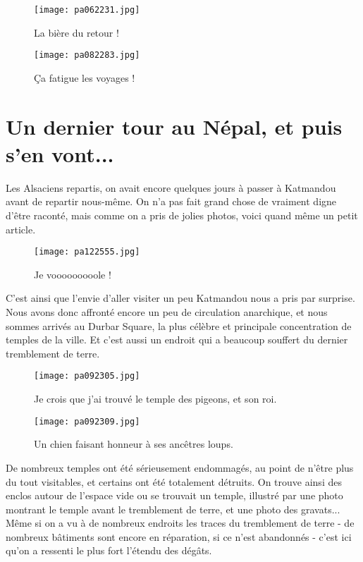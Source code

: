 \documentclass{book}
\begin{document}
\begin{figure}[h]
\centering
\texttt{[image: pa062231.jpg]}
\caption*{La bière du retour !}
\end{figure}


\begin{figure}[h]
\centering
\texttt{[image: pa082283.jpg]}
\caption*{Ça fatigue les voyages !}
\end{figure}



\chapter{Un dernier tour au Népal, et puis s'en vont...}
Les Alsaciens repartis, on avait encore quelques jours à passer à Katmandou avant de repartir nous-même. On n'a pas fait grand chose de vraiment digne d'être raconté, mais comme on a pris de jolies photos, voici quand même un petit article.


\begin{figure}[h]
\centering
\texttt{[image: pa122555.jpg]}
\caption*{Je vooooooooole !}
\end{figure}

C'est ainsi que l'envie d'aller visiter un peu Katmandou nous a pris par surprise. Nous avons donc affronté encore un peu de circulation anarchique, et nous sommes arrivés au Durbar Square, la plus célèbre et principale concentration de temples de la ville. Et c'est aussi un endroit qui a beaucoup souffert du dernier tremblement de terre.


\begin{figure}[h]
\centering
\texttt{[image: pa092305.jpg]}
\caption*{Je crois que j'ai trouvé le temple des pigeons, et son roi.}
\end{figure}


\begin{figure}[h]
\centering
\texttt{[image: pa092309.jpg]}
\caption*{Un chien faisant honneur à ses ancêtres loups.}
\end{figure}

De nombreux temples ont été sérieusement endommagés, au point de n'être plus du tout visitables, et certains ont été totalement détruits. On trouve ainsi des enclos autour de l'espace vide ou se trouvait un temple, illustré par une photo montrant le temple avant le tremblement de terre, et une photo des gravats... Même si on a vu à de nombreux endroits les traces du tremblement de terre - de nombreux bâtiments sont encore en réparation, si ce n'est abandonnés - c'est ici qu'on a ressenti le plus fort l'étendu des dégâts.
\end{document}
